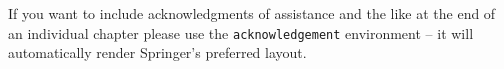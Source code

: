 \documentclass[graybox]{svmult}
\begin{document}








\begin{acknowledgement}
If you want to include acknowledgments of assistance and the like at the end of an individual chapter please use the \verb|acknowledgement| environment -- it will automatically render Springer's preferred layout.
\end{acknowledgement}
%

%
%

%


\end{document}
